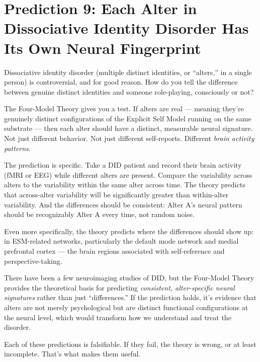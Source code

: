 \documentclass[11pt, twoside, openright]{book}
\begin{document}
\section*{Prediction 9: Each Alter in Dissociative Identity Disorder Has Its Own Neural Fingerprint}

Dissociative identity disorder (multiple distinct identities, or ``alters,'' in a single person) is controversial, and for good reason. How do you tell the difference between genuine distinct identities and someone role-playing, consciously or not?

The Four-Model Theory gives you a test. If alters are real --- meaning they're genuinely distinct configurations of the Explicit Self Model running on the same substrate --- then each alter should have a distinct, measurable neural signature. Not just different behavior. Not just different self-reports. Different \textit{brain activity patterns}.

The prediction is specific. Take a DID patient and record their brain activity (fMRI or EEG) while different alters are present. Compare the variability across alters to the variability within the same alter across time. The theory predicts that across-alter variability will be significantly greater than within-alter variability. And the differences should be consistent: Alter A's neural pattern should be recognizably Alter A every time, not random noise.

Even more specifically, the theory predicts where the differences should show up: in ESM-related networks, particularly the default mode network and medial prefrontal cortex --- the brain regions associated with self-reference and perspective-taking.

There have been a few neuroimaging studies of DID, but the Four-Model Theory provides the theoretical basis for predicting \textit{consistent, alter-specific neural signatures} rather than just ``differences.'' If the prediction holds, it's evidence that alters are not merely psychological but are distinct functional configurations at the neural level, which would transform how we understand and treat the disorder.

Each of these predictions is falsifiable. If they fail, the theory is wrong, or at least incomplete. That's what makes them useful.
\end{document}
